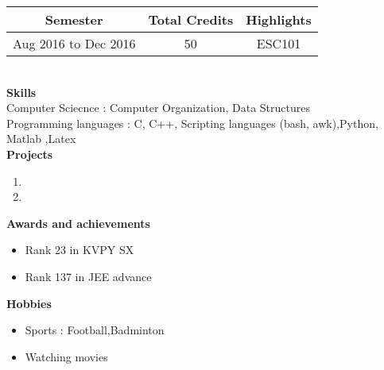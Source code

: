 \documentclass[a4paper, 11pt]{article}
\begin{document}
\noindent
\begin{tabular}{|c|c|c|}
  \hline
  {\bf Semester} & {\bf Total Credits} & {\bf Highlights}\\
  \hline
  Aug 2016 to Dec 2016 & 50 & ESC101 \\
  \hline
\end{tabular}
\vspace{0.3cm}
\\{\bf Skills}
\vspace{0.3cm}
\\Computer Sciecnce : Computer Organization, Data Structures
\\Programming languages : C, C++, Scripting languages (bash, awk),Python, Matlab ,Latex
\vspace{0.3cm}
\\{\bf Projects}
\vspace{0.3cm}
\begin{enumerate}
\item \lipsum[66]
\item \lipsum[75]
\end{enumerate}
\vspace{0.3cm}
{\bf Awards and achievements}\\
\begin{itemize}
  \renewcommand{\labelitemi}{$-$}
    \item Rank 23 in KVPY SX
    \item Rank 137 in JEE advance
\end{itemize}
\vspace{0.3cm}
{\bf Hobbies}\\
\begin{itemize}
  \renewcommand{\labelitemi}{$-$}
    \item Sports : Football,Badminton
    \item Watching movies
\end{itemize}

\vspace{0.3cm}
\end{document}
